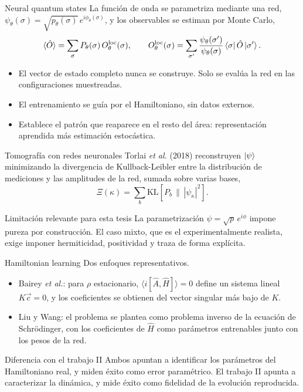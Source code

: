\documentclass[10pt,aspectratio=169]{beamer}
\newcommand{\Hop}{\hat{H}}
\newcommand{\dens}{\rho}
\begin{document}
\begin{frame}{Neural quantum states}
  La función de onda se parametriza mediante una red, $\psi_\theta(\sigma) = \sqrt{p_\theta(\sigma)}\, e^{i\phi_\theta(\sigma)}$, y los observables se estiman por Monte Carlo,
  \[
    \langle \hat{O} \rangle = \sum_\sigma P_\theta(\sigma)\, O^{\mathrm{loc}}_\theta(\sigma),
    \qquad
    O^{\mathrm{loc}}_\theta(\sigma) = \sum_{\sigma'} \frac{\psi_\theta(\sigma')}{\psi_\theta(\sigma)} \bra{\sigma}\hat{O}\ket{\sigma'} .
  \]
  \pause
  \vfill
  \begin{itemize}
    \item El vector de estado completo nunca se construye. Solo se evalúa la red en las configuraciones muestreadas.
    \item El entrenamiento se guía por el Hamiltoniano, sin datos externos.
    \item Establece el patrón que reaparece en el resto del área: representación aprendida más estimación estocástica.
  \end{itemize}
\end{frame}

\begin{frame}{Tomografía con redes neuronales}
  Torlai \emph{et al.} (2018) reconstruyen $\ket{\psi}$ minimizando la divergencia de Kullback-Leibler entre la distribución de mediciones y las amplitudes de la red, sumada sobre varias bases,
  \[
    \Xi(\kappa) = \sum_{b} \mathrm{KL}\!\left[ P_b \,\|\, |\psi_\kappa|^2 \right] .
  \]
  \pause
  \vfill
  \begin{block}{Limitación relevante para esta tesis}
    La parametrización $\psi = \sqrt{p}\,e^{i\phi}$ impone pureza por construcción. El caso mixto, que es el experimentalmente realista, exige imponer hermiticidad, positividad y traza de forma explícita.
  \end{block}
\end{frame}

\begin{frame}{Hamiltonian learning}
  Dos enfoques representativos.
  \vfill
  \begin{itemize}
    \item Bairey \emph{et al.}: para $\dens$ estacionario, $\langle i[\hat{A},\Hop]\rangle = 0$ define un sistema lineal $K\vec{c} = 0$, y los coeficientes se obtienen del vector singular más bajo de $K$.
    \pause
    \item Liu y Wang: el problema se plantea como problema inverso de la ecuación de Schrödinger, con los coeficientes de $\Hop$ como parámetros entrenables junto con los pesos de la red.
  \end{itemize}
  \pause
  \vfill
  \begin{alertblock}{Diferencia con el trabajo II}
    Ambos apuntan a identificar los parámetros del Hamiltoniano real, y miden éxito como error paramétrico. El trabajo II apunta a caracterizar la dinámica, y mide éxito como fidelidad de la evolución reproducida.
  \end{alertblock}
\end{frame}
\end{document}
